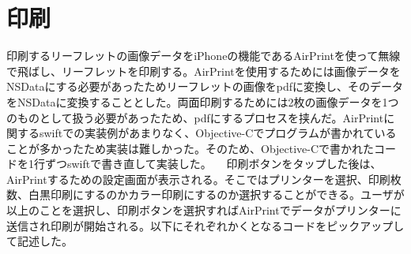 \section{印刷}
印刷するリーフレットの画像データをiPhoneの機能であるAirPrintを使って無線で飛ばし、リーフレットを印刷する。AirPrintを使用するためには画像データをNSDataにする必要があったためリーフレットの画像をpdfに変換し、そのデータをNSDataに変換することとした。両面印刷するためには2枚の画像データを1つのものとして扱う必要があったため、pdfにするプロセスを挟んだ。AirPrintに関するswiftでの実装例があまりなく、Objective-Cでプログラムが書かれていることが多かったため実装は難しかった。そのため、Objective-Cで書かれたコードを1行ずつswiftで書き直して実装した。
　印刷ボタンをタップした後は、AirPrintするための設定画面が表示される。そこではプリンターを選択、印刷枚数、白黒印刷にするのかカラー印刷にするのか選択することができる。ユーザが以上のことを選択し、印刷ボタンを選択すればAirPrintでデータがプリンターに送信され印刷が開始される。以下にそれぞれかくとなるコードをピックアップして記述した。
